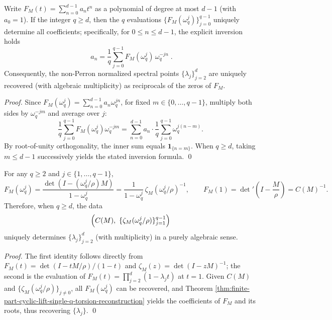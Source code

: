\begin{theorem}\label{thm:finite-part-cyclic-lift-single-q-torsion-reconstruction}
Write
\(
F_M(t)=\sum_{n=0}^{d-1}a_n t^n
\)
as a polynomial of degree at most \(d-1\) (with \(a_0=1\)).
If the integer \(q\ge d\), then the \(q\) evaluations \(\{F_M(\omega_q^j)\}_{j=0}^{q-1}\) uniquely determine all coefficients; specifically, for \(0\le n\le d-1\), the explicit inversion holds
\[
\boxed{\;
a_n=\frac{1}{q}\sum_{j=0}^{q-1}F_M(\omega_q^j)\,\omega_q^{-jn}\; }.
\]
Consequently, the non-Perron normalized spectral points \(\{\lambda_j\}_{j=2}^{d}\) are uniquely recovered (with algebraic multiplicity) as reciprocals of the zeros of \(F_M\).
\end{theorem}
\begin{proof}
Since \(F_M(\omega_q^j)=\sum_{n=0}^{d-1}a_n\omega_q^{jn}\), for fixed \(m\in\{0,\dots,q-1\}\), multiply both sides by \(\omega_q^{-jm}\) and average over \(j\):
\[
\frac{1}{q}\sum_{j=0}^{q-1}F_M(\omega_q^j)\omega_q^{-jm}
=\sum_{n=0}^{d-1}a_n\cdot \frac{1}{q}\sum_{j=0}^{q-1}\omega_q^{j(n-m)}.
\]
By root-of-unity orthogonality, the inner sum equals \(\mathbf{1}_{\{n=m\}}\).
When \(q\ge d\), taking \(m\le d-1\) successively yields the stated inversion formula. \qed
\end{proof}

\begin{corollary}\label{cor:finite-part-cyclic-lift-zeta-torsion-determines-spectrum}
For any \(q\ge 2\) and \(j\in\{1,\dots,q-1\}\),
\[
F_M(\omega_q^j)=\frac{\det(I-(\omega_q^j/\rho)M)}{1-\omega_q^j}
=\frac{1}{1-\omega_q^j}\,\zeta_M(\omega_q^j/\rho)^{-1},
\qquad
F_M(1)=\det\nolimits'\!\left(I-\frac{M}{\rho}\right)=C(M)^{-1}.
\]
Therefore, when \(q\ge d\), the data
\[
\Bigl(C(M),\ \{\zeta_M(\omega_q^j/\rho)\}_{j=1}^{q-1}\Bigr)
\]
uniquely determines \(\{\lambda_j\}_{j=2}^{d}\) (with multiplicity) in a purely algebraic sense.
\end{corollary}
\begin{proof}
The first identity follows directly from \(F_M(t)=\det(I-tM/\rho)/(1-t)\) and \(\zeta_M(z)=\det(I-zM)^{-1}\); the second is the evaluation of \(F_M(t)=\prod_{j=2}^{d}(1-\lambda_j t)\) at \(t=1\).
Given \(C(M)\) and \(\{\zeta_M(\omega_q^j/\rho)\}_{j\ne 0}\), all \(F_M(\omega_q^j)\) can be recovered, and Theorem \ref{thm:finite-part-cyclic-lift-single-q-torsion-reconstruction} yields the coefficients of \(F_M\) and its roots, thus recovering \(\{\lambda_j\}\). \qed
\end{proof}

